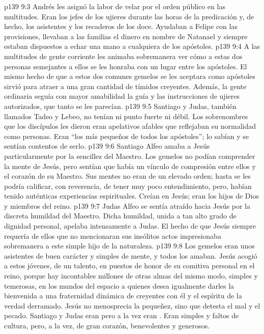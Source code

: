 \vs p139 9:3 Andrés les asignó la labor de velar por el orden público en las multitudes. Eran los jefes de los ujieres durante las horas de la predicación y, de hecho, los asistentes y los recaderos de los doce. Ayudaban a Felipe con las provisiones, llevaban a las familias el dinero en nombre de Natanael y siempre estaban dispuestos a echar una mano a cualquiera de los apóstoles.
\vs p139 9:4 A las multitudes de gente corriente les animaba sobremanera ver cómo a estas dos personas semejantes a ellos se les honraba con un lugar entre los apóstoles. El mismo hecho de que a estos dos comunes gemelos se les aceptara como apóstoles sirvió para atraer a una gran cantidad de tímidos creyentes. Además, la gente ordinaria seguía con mayor amabilidad la guía y las instrucciones de ujieres autorizados, que tanto se les parecían.
\vs p139 9:5 Santiago y Judas, también llamados Tadeo y Lebeo, no tenían ni punto fuerte ni débil. Los sobrenombres que los discípulos les dieron eran apelativos afables que reflejaban su normalidad como personas. Eran “los más pequeños de todos los apóstoles”; lo sabían y se sentían contentos de serlo.
\vs p139 9:6 \pc Santiago Alfeo amaba a Jesús particularmente por la sencillez del Maestro. Los gemelos no podían comprender la mente de Jesús, pero sentían que había un vínculo de compresión entre ellos y el corazón de su Maestro. Sus mentes no eran de un elevado orden; hasta se les podría calificar, con reverencia, de tener muy poco entendimiento, pero, habían tenido auténticas experiencias espirituales. Creían en Jesús; eran los hijos de Dios y miembros del reino.
\vs p139 9:7 Judas Alfeo se sentía atraído hacia Jesús por la discreta humildad del Maestro. Dicha humildad, unida a tan alto grado de dignidad personal, apelaba intensamente a Judas. El hecho de que Jesús siempre requería de ellos que no mencionaran sus insólitos actos impresionaba sobremanera a este simple hijo de la naturaleza.
\vs p139 9:8 \pc Los gemelos eran unos asistentes de buen carácter y simples de mente, y todos los amaban. Jesús acogió a estos jóvenes, de un talento, en puestos de honor de su comitiva personal en el reino, porque hay incontables millones de otras almas del mismo modo, simples y temerosas, en los mundos del espacio a quienes desea igualmente darles la bienvenida a una fraternidad dinámica de creyentes con él y el espíritu de la verdad derramado. Jesús no menosprecia la pequeñez, sino que detesta el mal y el pecado. Santiago y Judas eran  pero a la vez eran . Eran simples y faltos de cultura, pero, a la vez, de gran corazón, benevolentes y generosos.
